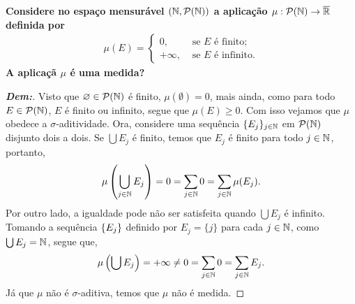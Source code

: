 \biglinend
\newpage 
{}
\myexe{\thedois}
\bigline
\textbf{Considere no espaço 
mensurável $(\mathbb N, \mathcal P(\mathbb N))$ a aplicação $\mu: \mathcal 
P(\mathbb N) \rightarrow \overline {\mathbb R}$
definida por 
\begin{align*}
  \mu(E) = \begin{cases}
    0, &\text{ se $E$ é finito;}\\
    +\infty, &\text{ se $E$ é infinito.}
  \end{cases}
\end{align*}
A aplicaçã $\mu$ é uma medida?
}
\begin{proof}[\textbf{Dem:}]
  Visto que $\varnothing \in \mathcal P(\mathbb N)$ é finito, 
  $\mu(\emptyset) = 0$, mais ainda, como para todo 
  $E \in \mathcal P (\mathbb N)$, $E$ é finito ou infinito, segue que $\mu(E) \ge 0$. Com isso
  vejamos que $\mu$ obedece a $\sigma$-aditividade. Ora, considere uma sequência  
  $\{E_j\}_{j \in \mathbb N}$ em $\mathcal P(\mathbb N)$ disjunto dois a dois. Se $\bigcup E_j$
  é finito, temos que $E_j$ é finito para todo $j \in \mathbb N$, portanto, 
  \begin{align*}
    \mu\left(\bigcup_{j \in \mathbb N} E_j\right) = 0 = \sum_{j \in \mathbb N} 0
    = \sum_{j \in \mathbb N} \mu(E_j). 
  \end{align*}
  Por outro lado, a igualdade pode não ser satisfeita quando 
  $\bigcup E_j$ é infinito. Tomando a sequência $\left\{E_j\right\}$
  definido por $E_j = \{j\}$ para cada $j \in \mathbb N$, como $\bigcup E_j = \mathbb N$, segue que, 
  \begin{align*}
    \mu\left(\bigcup E_j\right) = +\infty \neq 0 = \sum_{j \in \mathbb N} 0 = \sum_{j \in \mathbb N} E_j.
  \end{align*}
  Já que $\mu$ não é $\sigma$-aditiva, temos que $\mu$ não é medida.
\end{proof}


